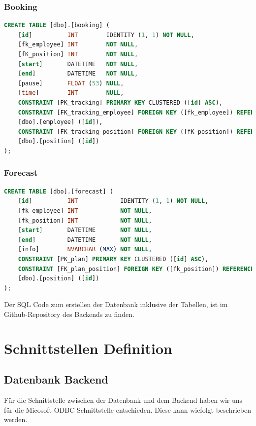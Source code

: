 \documentclass{article}
\begin{document}
        \subsubsection{Booking}
        \begin{lstlisting}[language=Sql, caption= Create Table Statement für Booking Table]
    CREATE TABLE [dbo].[booking] (
    [id]          INT        IDENTITY (1, 1) NOT NULL,
    [fk_employee] INT        NOT NULL,
    [fK_position] INT        NOT NULL,
    [start]       DATETIME   NOT NULL,
    [end]         DATETIME   NOT NULL,
    [pause]       FLOAT (53) NULL,
    [time]        INT        NULL,
    CONSTRAINT [PK_tracking] PRIMARY KEY CLUSTERED ([id] ASC),
    CONSTRAINT [FK_tracking_employee] FOREIGN KEY ([fk_employee]) REFERENCES
    [dbo].[employee] ([id]),
    CONSTRAINT [FK_tracking_position] FOREIGN KEY ([fK_position]) REFERENCES
    [dbo].[position] ([id])
);


         \end{lstlisting}
        \subsubsection{Forecast}
        \begin{lstlisting}[language=Sql, caption= Create Table Statement für Forecast Table]
    CREATE TABLE [dbo].[forecast] (
    [id]          INT            IDENTITY (1, 1) NOT NULL,
    [fk_employee] INT            NOT NULL,
    [fk_position] INT            NOT NULL,
    [start]       DATETIME       NOT NULL,
    [end]         DATETIME       NOT NULL,
    [info]        NVARCHAR (MAX) NOT NULL,
    CONSTRAINT [PK_plan] PRIMARY KEY CLUSTERED ([id] ASC),
    CONSTRAINT [FK_plan_position] FOREIGN KEY ([fk_position]) REFERENCES 
    [dbo].[position] ([id])
);


         \end{lstlisting}

    Der SQL Code zum erstellen der Datenbank inklusive der Tabellen, ist im Github-Repository des Backends zu finden.

\newpage

\section{Schnittstellen Definition}

    \subsection{Datenbank Backend}
    Für die Schnittstelle zwischen der Datenbank und dem Backend haben wir uns für die Micosoft ODBC Schnittstelle entschieden. Diese kann wiefolgt beschrieben werden.
    
\end{document}
